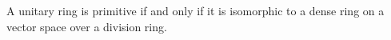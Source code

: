 %
%
%
%


\begin{theorem}[Jacobson]
	\label{thm:density}
	A unitary ring is primitive if and only if it is isomorphic to a dense ring on 
	a vector space over a division ring.
\end{theorem}

